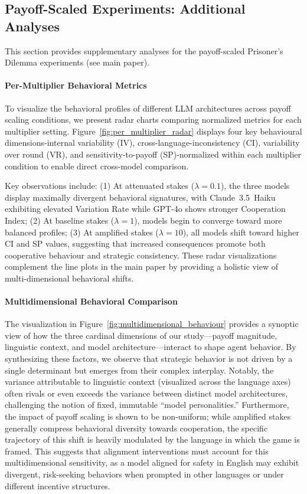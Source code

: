 \documentclass{article}
\begin{document}
\subsection{Payoff-Scaled Experiments: Additional Analyses}
\label{appendix:payoff_scaled}

This section provides supplementary analyses for the payoff-scaled Prisoner's Dilemma experiments (see main paper).

\paragraph{Per-Multiplier Behavioral Metrics}
\label{appendix:per_multiplier_metrics}

To visualize the behavioral profiles of different LLM architectures across payoff scaling conditions, we present radar charts comparing normalized metrics for each multiplier setting. Figure~\ref{fig:per_multiplier_radar} displays four key behavioural dimensions-internal variability (IV), cross-language-inconsistency (CI), variability over round (VR), and sensitivity-to-payoff (SP)-normalized within each multiplier condition to enable direct cross-model comparison.

Key observations include: (1) At attenuated stakes ($\lambda=0.1$), the three models display maximally divergent behavioral signatures, with Claude~3.5~Haiku exhibiting elevated Variation Rate while GPT-4o shows stronger Cooperation Index; (2) At baseline stakes ($\lambda=1$), models begin to converge toward more balanced profiles; (3) At amplified stakes ($\lambda=10$), all models shift toward higher CI and SP values, suggesting that increased consequences promote both cooperative behaviour and strategic consistency. These radar visualizations complement the line plots in the main paper by providing a holistic view of multi-dimensional behavioral shifts.

\paragraph{Multidimensional Behavioral Comparison}
\label{appendix:multidimensional}
The visualization in Figure~\ref{fig:multidimensional_behaviour} provides a synoptic view of how the three cardinal dimensions of our study—payoff magnitude, linguistic context, and model architecture—interact to shape agent behavior. By synthesizing these factors, we observe that strategic behavior is not driven by a single determinant but emerges from their complex interplay. Notably, the variance attributable to linguistic context (visualized across the language axes) often rivals or even exceeds the variance between distinct model architectures, challenging the notion of fixed, immutable ``model personalities.'' Furthermore, the impact of payoff scaling is shown to be non-uniform; while amplified stakes generally compress behavioral diversity towards cooperation, the specific trajectory of this shift is heavily modulated by the language in which the game is framed. This suggests that alignment interventions must account for this multidimensional sensitivity, as a model aligned for safety in English may exhibit divergent, risk-seeking behaviors when prompted in other languages or under different incentive structures.
\end{document}
